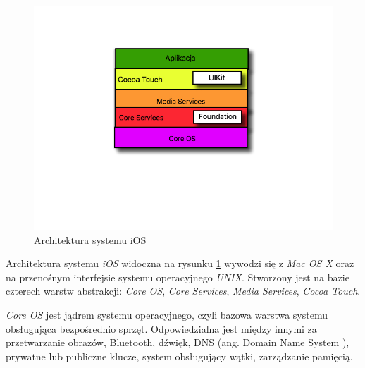 \documentclass{iiuwb}
\begin{document}
\begin{figure}[!th]
\centering
\includegraphics[scale=.5]{image/ArchitekturaiOS.jpg}
\caption{Architektura systemu iOS}
\label{fig:Architektura iOS}
\end{figure}
Architektura systemu \textit{iOS}  widoczna na rysunku \ref{fig:Architektura iOS} wywodzi się z \textit{Mac OS X}  oraz na przenośnym interfejsie systemu operacyjnego \textit{UNIX}. Stworzony jest na bazie czterech warstw abstrakcji: \textit{Core OS}, \textit{Core Services}, \textit{Media Services}, \textit{Cocoa Touch}.

\textit{Core OS} jest jądrem systemu operacyjnego, czyli bazowa warstwa systemu obsługująca bezpośrednio sprzęt. Odpowiedzialna jest między innymi za przetwarzanie obrazów, Bluetooth, dźwięk, DNS (ang. Domain Name System ), prywatne lub publiczne klucze, system obsługujący wątki, zarządzanie pamięcią.
\end{document}
